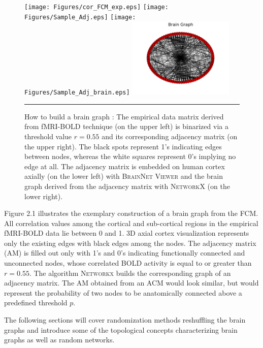 \begin{figure}[htbp]
  \centering
	 \texttt{[image: Figures/cor\_FCM\_exp.eps]} 
	 \texttt{[image: Figures/Sample\_Adj.eps]} 
	\texttt{[image: Figures/Sample\_Adj\_brain.eps]}  
   \includegraphics[width=0.45\textwidth]{Figures/brain_graph.png}      

    \rule{35em}{0.5pt}
  \caption[Binarizing via thresholding]{How to build a brain graph : The empirical data matrix derived from fMRI-BOLD technique (on the upper left) is binarized via a threshold value $r=0.55$ and its corresponding adjacency matrix (on the upper right). The black spots represent 1's indicating edges between nodes, whereas the white squares represent 0's implying no edge at all. The adjacency matrix is embedded on human cortex axially (on the lower left) with \textsc{BrainNet Viewer} \citep{XYZ13} and the brain graph derived from the adjacency matrix with \textsc{NetworkX} \citep{XYZNETW}(on the lower right).}
  \label{fig:Binarizing via thresholding}
\end{figure}

Figure 2.1 illustrates the exemplary construction of a brain graph from the FCM. All correlation values among the cortical and sub-cortical regions in the empirical fMRI-BOLD data lie between 0 and 1. 3D axial cortex visualization represents only the existing edges with black edges among the nodes. The adjacency matrix (AM) is filled out only with 1's and 0's indicating functionally connected and unconnected nodes, whose correlated BOLD activity is equal to or greater than $r=0.55$. The algorithm \textsc{Networkx} builds the corresponding graph of an adjacency matrix. The AM obtained from an ACM would look similar, but would represent the probability of two nodes to be anatomically connected above a predefined threshold $p$. 

The following sections will cover randomization methods reshuffling the brain graphs and introduce some of the topological concepts characterizing brain graphs as well as random networks.



